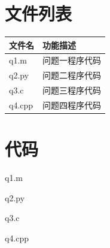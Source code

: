 \documentclass[withoutpreface,bwprint]{cumcmthesis}
\begin{document}
\nocite{*}

\newpage
\begin{appendices}
\section{文件列表}
\begin{table}[H]
\centering
\begin{tabularx}{\textwidth}{LL}
\toprule
文件名   & 功能描述 \\
\midrule
q1.m & 问题一程序代码 \\
q2.py & 问题二程序代码 \\
q3.c & 问题三程序代码 \\
q4.cpp & 问题四程序代码 \\
\bottomrule
\end{tabularx}
\label{tab:文件列表}
\end{table}

\section{代码}
\noindent q1.m

q2.py

q3.c

q4.cpp

\end{appendices}
\end{document}
